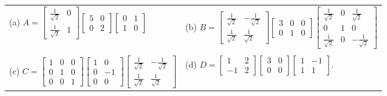 \documentclass[11pt]{article}
\begin{document}
\begin{enumerate}
	\hspace{-12mm}
	\begin{tabular}{ll}
		 (a) $\displaystyle A = \begin{bmatrix} \frac{1}{\sqrt{2}} & 0 \\ \frac{1}{\sqrt{2}} & 1 \end{bmatrix} \begin{bmatrix} 5 & 0 \\ 0 & 2 \end{bmatrix} \begin{bmatrix} 0 & 1  \\ 1 & 0  \end{bmatrix}$
		& 
		(b) $\displaystyle B = \begin{bmatrix} \frac{1}{\sqrt{2}} & -\frac{1}{\sqrt{2}} \\ \frac{1}{\sqrt{2}} & \frac{1}{\sqrt{2}} \end{bmatrix} \begin{bmatrix} 3 & 0 & 0\\ 0 & 1 & 0 \end{bmatrix} \begin{bmatrix} \frac{1}{\sqrt{2}} & 0 & \frac{1}{\sqrt{2}} \\ 0 & 1 & 0 \\ \frac{1}{\sqrt{2}} & 0 & -\frac{1}{\sqrt{2}} \end{bmatrix}$
		\\		
		\\
		(c) $\displaystyle C = \begin{bmatrix} 1 & 0 & 0 \\ 0 & 1 & 0 \\ 0 & 0 & 1 \end{bmatrix} \begin{bmatrix} 1 & 0\\ 0 & -1 \\ 0 & 0\end{bmatrix} \begin{bmatrix} \frac{1}{\sqrt{2}} & -\frac{1}{\sqrt{2}} \\ \frac{1}{\sqrt{2}} & \frac{1}{\sqrt{2}} \end{bmatrix}$
		&
		(d) $\displaystyle D = \begin{bmatrix} 1 & 2 \\ -1 & 2 \end{bmatrix} \begin{bmatrix} 3 & 0 \\ 0 & 0 \end{bmatrix} \begin{bmatrix} 1 & -1 \\ 1 & 1\end{bmatrix}$.
	\end{tabular}
	

\end{enumerate}
\end{document}
